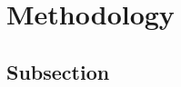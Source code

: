 \section{Methodology}
\label{sec:methodology}


\subsection{Subsection}
\label{sec:methodology:subsection}
